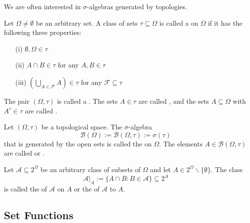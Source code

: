 \documentclass[12pt, a4paper, oneside, openright, titlepage]{book}
\begin{document}
We are often interested in $\sigma$-algebras generated by topologies. 

\begin{defn}
    Let $\Omega \neq \emptyset$ be an arbitrary set. A class of sets $\tau \subseteq \Omega$ is called a  on $\Omega$ if it has the following three properties:  \begin{itemize}
        \item[(i)] $\emptyset, \Omega \in \tau$ 
        \item[(ii)] $A\cap B \in \tau$ for any $A,B\in \tau$
        \item[(iii)] $\left(\bigcup_{A\in\mathcal{F}}A\right)\in\tau$ for any $\mathcal{F}\subseteq \tau$
    \end{itemize}
    The pair $(\Omega,\tau)$ is called a . The sets $A \in \tau$ are called , and the sets $A \subseteq \Omega$ with $A^c \in \tau$ are called .
\end{defn}

\begin{defn}
    Let $(\Omega,\tau)$ be a topological space. The $\sigma$-algebra \begin{equation*}
        \mathcal{B}(\Omega) := \mathcal{B}(\Omega,\tau) := \sigma(\tau)
    \end{equation*}
    that is generated by the open sets is called the  on $\Omega$. The elements $A \in \mathcal{B}(\Omega,\tau)$ are called  or .
\end{defn}

\begin{defn}
    Let $\mathcal{A} \subseteq 2^{\Omega}$ be an arbitrary class of subsets of $\Omega$ and let $A \in 2^{\Omega}\backslash\{\emptyset\}$. The class \begin{equation*}
        \mathcal{A}\vert_A := \{A\cap B:B \in \mathcal{A}\}\subseteq 2^A
    \end{equation*}
    is called the  of $\mathcal{A}$ on $A$ or the  of $\mathcal{A}$ to $A$.
\end{defn}


\subsection{Set Functions}
\end{document}
